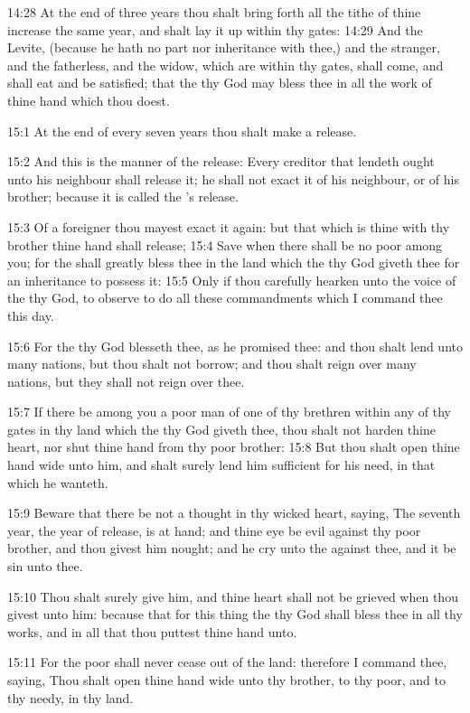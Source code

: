 14:28 At the end of three years thou shalt bring forth all the tithe
of thine increase the same year, and shalt lay it up within thy gates:
14:29 And the Levite, (because he hath no part nor inheritance with
thee,) and the stranger, and the fatherless, and the widow, which are
within thy gates, shall come, and shall eat and be satisfied; that the
\LORD thy God may bless thee in all the work of thine hand which thou
doest.

15:1 At the end of every seven years thou shalt make a release.

15:2 And this is the manner of the release: Every creditor that
lendeth ought unto his neighbour shall release it; he shall not exact
it of his neighbour, or of his brother; because it is called the
\LORD's release.

15:3 Of a foreigner thou mayest exact it again: but that which is
thine with thy brother thine hand shall release; 15:4 Save when there
shall be no poor among you; for the \LORD shall greatly bless thee in
the land which the \LORD thy God giveth thee for an inheritance to
possess it: 15:5 Only if thou carefully hearken unto the voice of the
\LORD thy God, to observe to do all these commandments which I command
thee this day.

15:6 For the \LORD thy God blesseth thee, as he promised thee: and thou
shalt lend unto many nations, but thou shalt not borrow; and thou
shalt reign over many nations, but they shall not reign over thee.

15:7 If there be among you a poor man of one of thy brethren within
any of thy gates in thy land which the \LORD thy God giveth thee, thou
shalt not harden thine heart, nor shut thine hand from thy poor
brother: 15:8 But thou shalt open thine hand wide unto him, and shalt
surely lend him sufficient for his need, in that which he wanteth.

15:9 Beware that there be not a thought in thy wicked heart, saying,
The seventh year, the year of release, is at hand; and thine eye be
evil against thy poor brother, and thou givest him nought; and he cry
unto the \LORD against thee, and it be sin unto thee.

15:10 Thou shalt surely give him, and thine heart shall not be grieved
when thou givest unto him: because that for this thing the \LORD thy
God shall bless thee in all thy works, and in all that thou puttest
thine hand unto.

15:11 For the poor shall never cease out of the land: therefore I
command thee, saying, Thou shalt open thine hand wide unto thy
brother, to thy poor, and to thy needy, in thy land.

